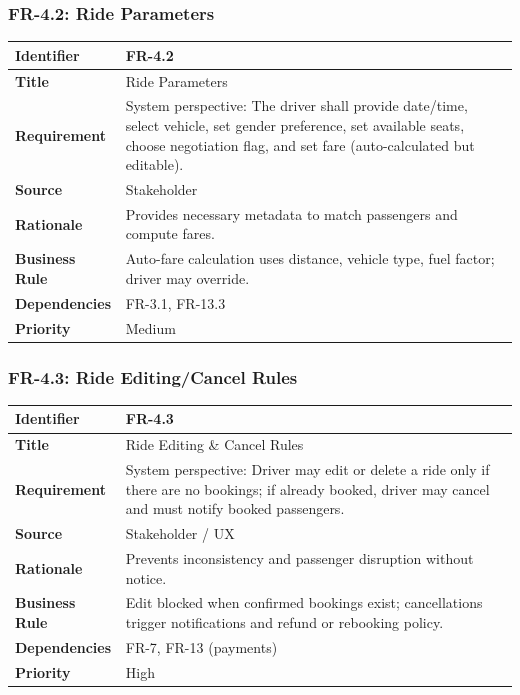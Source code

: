 \subsubsection{FR-4.2: Ride Parameters}

\begin{longtable}{|p{3cm}|p{12cm}|}
\hline
\rowcolor{lightgray!30}
\textbf{Identifier} & FR-4.2 \\
\hline
\textbf{Title} & Ride Parameters \\
\hline
\textbf{Requirement} & System perspective: The driver shall provide date/time, select vehicle, set gender preference, set available seats, choose negotiation flag, and set fare (auto-calculated but editable). \\
\hline
\textbf{Source} & Stakeholder \\
\hline
\textbf{Rationale} & Provides necessary metadata to match passengers and compute fares. \\
\hline
\textbf{Business Rule} & Auto-fare calculation uses distance, vehicle type, fuel factor; driver may override. \\
\hline
\textbf{Dependencies} & FR-3.1, FR-13.3 \\
\hline
\textbf{Priority} & Medium \\
\hline
\end{longtable}

\subsubsection{FR-4.3: Ride Editing/Cancel Rules}

\begin{longtable}{|p{3cm}|p{12cm}|}
\hline
\rowcolor{lightgray!30}
\textbf{Identifier} & FR-4.3 \\
\hline
\textbf{Title} & Ride Editing \& Cancel Rules \\
\hline
\textbf{Requirement} & System perspective: Driver may edit or delete a ride only if there are no bookings; if already booked, driver may cancel and must notify booked passengers. \\
\hline
\textbf{Source} & Stakeholder / UX \\
\hline
\textbf{Rationale} & Prevents inconsistency and passenger disruption without notice. \\
\hline
\textbf{Business Rule} & Edit blocked when confirmed bookings exist; cancellations trigger notifications and refund or rebooking policy. \\
\hline
\textbf{Dependencies} & FR-7, FR-13 (payments) \\
\hline
\textbf{Priority} & High \\
\hline
\end{longtable}

